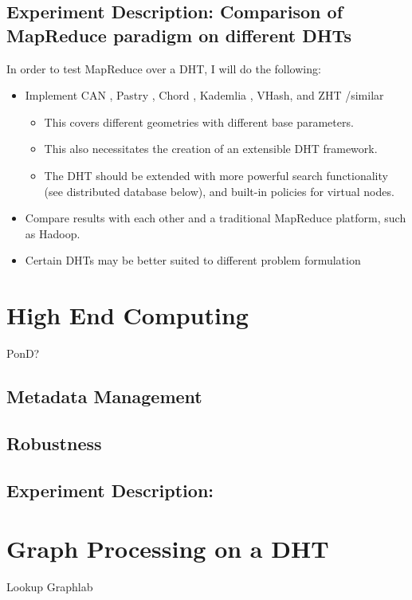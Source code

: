 \documentclass[10pt,letterpaper]{report}
\begin{document}
\subsection{Experiment Description: Comparison of MapReduce paradigm on different DHTs}
In order to test MapReduce over a DHT, I will do the following:
\begin{itemize}
	\item Implement CAN \cite{can}, Pastry \cite{pastry}, Chord \cite{chord}, Kademlia \cite{kademlia}, VHash, and ZHT \cite{li2013zht} /similar
	\begin{itemize}	
		\item This covers different geometries with different base parameters.
		\item This also necessitates the creation of an extensible DHT framework.
		\item  The DHT should be extended with more powerful search functionality (see distributed database below), and built-in policies for virtual nodes.
		
	\end{itemize}
	\item Compare results with each other and a traditional MapReduce platform, such as Hadoop.
	\item Certain DHTs may be better suited to different problem formulation
	
\end{itemize}



\section{High End Computing}
PonD?
\subsection{Metadata Management}
\subsection{Robustness}

\subsection{Experiment Description:}

\section{Graph Processing on a DHT}
Lookup Graphlab
\end{document}
